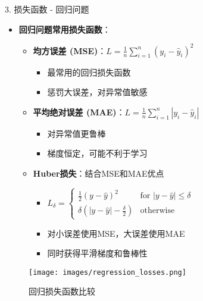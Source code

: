 \documentclass[
  ignorenonframetext,
  aspectratio=169,
  chinese-hans,
]{beamer}
\providecommand{\tightlist}{%
  \setlength{\itemsep}{0pt}\setlength{\parskip}{0pt}}\usepackage{longtable,booktabs,array}
\begin{document}
\begin{frame}{3. 损失函数 - 回归问题}
\label{ux635fux5931ux51fdux6570---ux56deux5f52ux95eeux9898}
\begin{itemize}
\item
  \textbf{回归问题常用损失函数}：

  \begin{itemize}
  \tightlist
  \item
    \textbf{均方误差
    (MSE)}：\(L = \frac{1}{n}\sum_{i=1}^{n}(y_i - \hat{y}_i)^2\)

    \begin{itemize}
    \tightlist
    \item
      最常用的回归损失函数
    \item
      惩罚大误差，对异常值敏感
    \end{itemize}
  \item
    \textbf{平均绝对误差
    (MAE)}：\(L = \frac{1}{n}\sum_{i=1}^{n}|y_i - \hat{y}_i|\)

    \begin{itemize}
    \tightlist
    \item
      对异常值更鲁棒
    \item
      梯度恒定，可能不利于学习
    \end{itemize}
  \item
    \textbf{Huber损失}：结合MSE和MAE优点

    \begin{itemize}
    \tightlist
    \item
      \(L_\delta = \begin{cases}
        \frac{1}{2}(y - \hat{y})^2 & \text{for } |y - \hat{y}| \leq \delta \\
        \delta(|y - \hat{y}| - \frac{\delta}{2}) & \text{otherwise}
      \end{cases}\)
    \item
      对小误差使用MSE，大误差使用MAE
    \item
      同时获得平滑梯度和鲁棒性
    \end{itemize}
  \end{itemize}
\end{itemize}

\begin{figure}[H]

{\centering \texttt{[image: images/regression\_losses.png]}

}

\caption{回归损失函数比较}

\end{figure}%
\end{frame}
\end{document}
